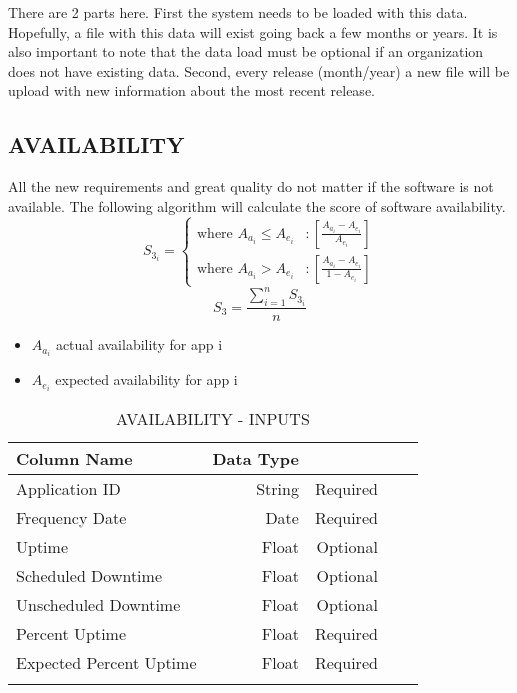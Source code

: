 \documentclass[SDSUThesis.tex]{subfiles}
\begin{document}
There are 2 parts here.  First the system needs to be loaded with this data.  Hopefully,
a file with this data will exist going back a few months or years.  It is also important
to note that the data load must be optional if an organization does not have existing
data.  Second, every release (month/year) a new file will be upload with new information
about the most recent release.



\subsection{AVAILABILITY}
All the new requirements and great quality do not matter if the software is not available.  
The following algorithm will calculate the score of software availability.
\begin{displaymath}
   S_{3_i} = \left\{
     \begin{array}{lr}
       \text{where } A_{a_i} \leq A_{e_i} & : \left[ \frac{A_{a_i} - A_{e_i}}{A_{e_i}} \right] \\
       \text{where } A_{a_i} > A_{e_i}  & : \left[ \frac{A_{a_i} - A_{e_i} }{1-A_{e_i}} \right]
     \end{array}
   \right.
\end{displaymath} 
\[
    S_3 = \frac{\sum^n_{i=1}S_{3_i}}{n}
\]

\begin{itemize}
\item $A_{a_i}$ actual availability for app i
\item $A_{e_i}$ expected availability for app i
\end{itemize}

\begin{longtable}{@{}l rr rr}

\toprule%
 \centering%
 {\bfseries Column Name}
 & {\bfseries Data Type}
 &  \\

\cmidrule[0.4pt](r{0.125em}){1-1}%
\cmidrule[0.4pt](lr{0.125em}){2-2}%
\cmidrule[0.4pt](l{0.125em}){3-3}%
\endhead

Application ID & String  & Required \\
\myrowcolour%
Frequency Date & Date & Required \\
Uptime & Float & Optional \\
\myrowcolour%
Scheduled Downtime & Float & Optional \\
Unscheduled Downtime & Float  & Optional \\
\myrowcolour%
Percent Uptime & Float & Required \\
Expected Percent Uptime & Float & Required \\

\bottomrule

\caption{AVAILABILITY - INPUTS}
\label{tab:avail}
\end{longtable}
\end{document}
